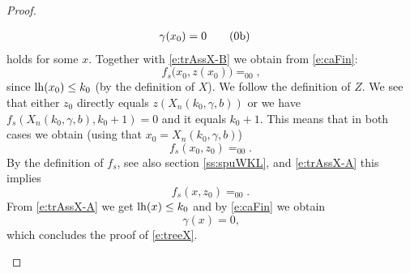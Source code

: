 \begin{proof}
\begin{itemize}
\begin{align*}
&\gamma
       (x_0)=0
                   \tag{\arabic{equation}b}\label{e:trAssX-B}
\end{align*}
holds for some $x$. Together with \eqref{e:trAssX-B} we obtain from 
\eqref{e:caFin}:
\[
f_s\big( x_0, z(x_0 )\big)=_00
\text{,}
\]
since $\operatorname{lh}(x_0)\leq k_0$ (by the definition of $X$). 
We follow the definition of $Z$. We see that 
either $z_0$ directly equals $z(X_n(k_0,\gamma,b))$ or 
we have $f_s(X_n(k_0,\gamma,b),k_0+1)=0$ and it equals $k_0+1$.
This means that in both cases we obtain (using that $x_0 = X_n(k_0,\gamma,b)$)
\[
f_s( x_0, z_0 )=_00
\text{.}
\]
By the definition of $f_s$, see also section \ref{ss:spuWKL}, and 
\eqref{e:trAssX-A} this implies
\[
f_s( x, z_0 )=_00
\text{.}
\]
From \eqref{e:trAssX-A} we get $\operatorname{lh}(x)\leq k_0$ and by \eqref{e:caFin} we 
obtain
\[
\gamma(x)=0
\text{,}
\]
which concludes the proof of \eqref{e:treeX}.\\


\end{itemize}
\end{proof}
